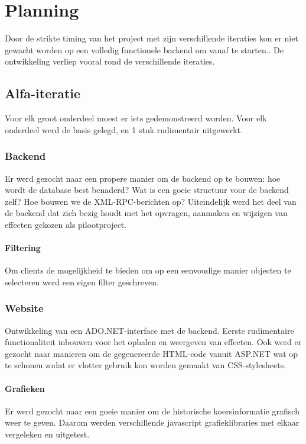 \section{Planning}

Door de strikte timing van het project met zijn verschillende iteraties kon er niet gewacht worden op een volledig functionele backend om vanaf te starten.. De ontwikkeling verliep vooral rond de verschillende iteraties.

\subsection{Alfa-iteratie}
Voor elk groot onderdeel moest er iets gedemonstreerd worden. Voor elk onderdeel werd de basis gelegd, en 1 stuk rudimentair uitgewerkt.

\subsubsection{Backend}
Er werd gezocht naar een propere manier om de backend op te bouwen: hoe wordt de database best benaderd? Wat is een goeie structuur voor de backend zelf? Hoe bouwen we de XML-RPC-berichten op?
Uiteindelijk werd het deel van de backend dat zich bezig houdt met het opvragen, aanmaken en wijzigen van effecten gekozen als pilootproject.
\paragraph{Filtering}
Om clients de mogelijkheid te bieden om op een eenvoudige manier objecten te selecteren werd een eigen filter geschreven.

\subsubsection{Website}
Ontwikkeling van een ADO.NET-interface met de backend. Eerste rudimentaire functionaliteit inbouwen voor het ophalen en weergeven van effecten. Ook werd er gezocht naar manieren om de gegenereerde HTML-code vanuit ASP.NET wat op te schonen zodat er vlotter gebruik kon worden gemaakt van CSS-stylesheets.
\paragraph{Grafieken}
Er werd gezocht naar een goeie manier om de historische koersinformatie grafisch weer te geven. Daarom werden verschillende javascript grafieklibraries met elkaar vergeleken en uitgetest.


